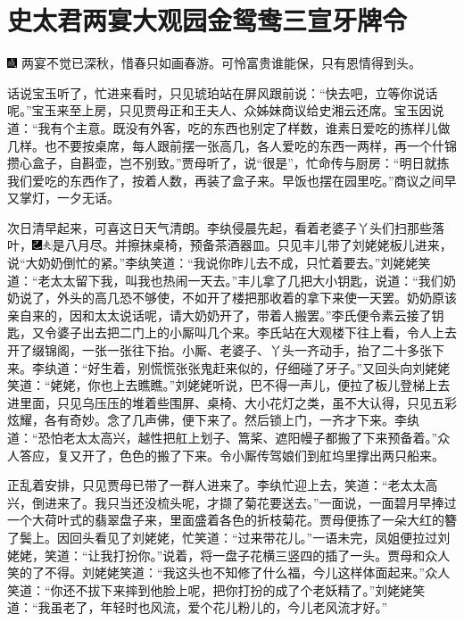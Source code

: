 

\chapter{史太君两宴大观园\hspace{.5em}金鸳鸯三宣牙牌令}
{\includegraphics[width=3mm]{../Images/00005} \kaishu 两宴不觉已深秋，惜春只如画春游。可怜富贵谁能保，只有恩情得到头。}

话说宝玉听了，忙进来看时，只见琥珀站在屏风跟前说：``快去吧，立等你说话呢。''宝玉来至上房，只见贾母正和王夫人、众姊妹商议给史湘云还席。宝玉因说道：``我有个主意。既没有外客，吃的东西也别定了样数，谁素日爱吃的拣样儿做几样。也不要按桌席，每人跟前摆一张高几，各人爱吃的东西一两样，再一个什锦攒心盒子，自斟壶，岂不别致。''贾母听了，说``很是''，忙命传与厨房：``明日就拣我们爱吃的东西作了，按着人数，再装了盒子来。早饭也摆在园里吃。''商议之间早又掌灯，一夕无话。

次日清早起来，可喜这日天气清朗。李纨侵晨先起，看着老婆子丫头们扫那些落叶，{\includegraphics[width=3mm]{../Images/00003}\includegraphics[width=3mm]{../Images/00012}\footnotesize \kaishu 是八月尽。}并擦抹桌椅，预备茶酒器皿。只见丰儿带了刘姥姥板儿进来，说``大奶奶倒忙的紧。''李纨笑道：``我说你昨儿去不成，只忙着要去。''刘姥姥笑道：``老太太留下我，叫我也热闹一天去。''丰儿拿了几把大小钥匙，说道：``我们奶奶说了，外头的高几恐不够使，不如开了楼把那收着的拿下来使一天罢。奶奶原该亲自来的，因和太太说话呢，请大奶奶开了，带着人搬罢。''李氏便令素云接了钥匙，又令婆子出去把二门上的小厮叫几个来。李氏站在大观楼下往上看，令人上去开了缀锦阁，一张一张往下抬。小厮、老婆子、丫头一齐动手，抬了二十多张下来。李纨道：``好生着，别慌慌张张鬼赶来似的，仔细碰了牙子。''又回头向刘姥姥笑道：``姥姥，你也上去瞧瞧。''刘姥姥听说，巴不得一声儿，便拉了板儿登梯上去进里面，只见乌压压的堆着些围屏、桌椅、大小花灯之类，虽不大认得，只见五彩炫耀，各有奇妙。念了几声佛，便下来了。然后锁上门，一齐才下来。李纨道：``恐怕老太太高兴，越性把舡上划子、篙桨、遮阳幔子都搬了下来预备着。''众人答应，复又开了，色色的搬了下来。令小厮传驾娘们到舡坞里撑出两只船来。

正乱着安排，只见贾母已带了一群人进来了。李纨忙迎上去，笑道：``老太太高兴，倒进来了。我只当还没梳头呢，才撷了菊花要送去。''一面说，一面碧月早捧过一个大荷叶式的翡翠盘子来，里面盛着各色的折枝菊花。贾母便拣了一朵大红的簪了鬓上。因回头看见了刘姥姥，忙笑道：``过来带花儿。''一语未完，凤姐便拉过刘姥姥，笑道：``让我打扮你。''说着，将一盘子花横三竖四的插了一头。贾母和众人笑的了不得。刘姥姥笑道：``我这头也不知修了什么福，今儿这样体面起来。''众人笑道：``你还不拔下来摔到他脸上呢，把你打扮的成了个老妖精了。''刘姥姥笑道：``我虽老了，年轻时也风流，爱个花儿粉儿的，今儿老风流才好。''

